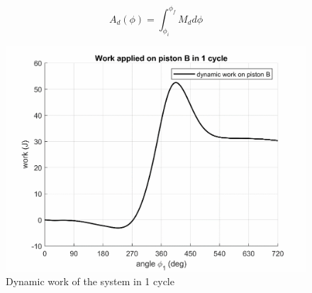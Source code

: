 \begin{equation}
	A_d(\phi)=\int_{\phi_i}^{\phi_f}M_d d\phi
\end{equation}
\begin{figure}[h]
	\centering
	\includegraphics[width=0.6\linewidth]{14}
	\caption{Dynamic work of the system in 1 cycle}
	\label{fig:14}
\end{figure}

